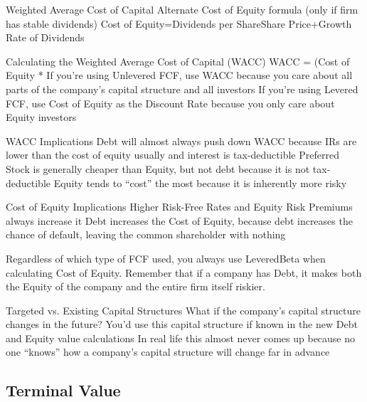 \documentclass[10pt]{article}
\begin{document}
\begin{core}{Weighted Average Cost of Capital}
      Alternate Cost of Equity formula (only if firm has stable dividends)
      Cost of Equity=Dividends per ShareShare Price+Growth Rate of Dividends

      Calculating the Weighted Average Cost of Capital (WACC)
      WACC = (Cost of Equity * %
      If you’re using Unlevered FCF, use WACC because you care about all parts of the company’s capital structure and all investors
      If you’re using Levered FCF, use Cost of Equity as the Discount Rate because you only care about Equity investors

      WACC Implications
      Debt will almost always push down WACC because IRs are lower than the cost of equity usually and interest is tax-deductible
      Preferred Stock is generally cheaper than Equity, but not debt because it is not tax-deductible
      Equity tends to “cost” the most because it is inherently more risky

      Cost of Equity Implications
      Higher Risk-Free Rates and Equity Risk Premiums always increase it
      Debt increases the Cost of Equity, because debt increases the chance of default, leaving the common shareholder with nothing

      Regardless of which type of FCF used, you always use LeveredBeta when calculating Cost of Equity. Remember that if a company has Debt, it makes both the Equity of the company and the entire firm itself riskier.

      Targeted vs. Existing Capital Structures
      What if the company’s capital structure changes in the future?
      You’d use this capital structure if known in the new Debt and Equity value calculations
      In real life this almost never comes up because no one “knows” how a company’s capital structure will change far in advance

    \end{core}

  \subsection{Terminal Value}
\end{document}
